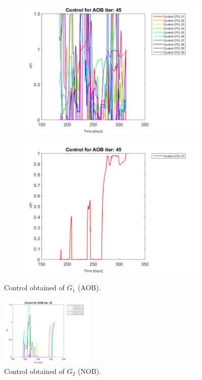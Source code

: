\documentclass[3p,times]{elsarticle}
\begin{document}
\begin{figure}[h]
\begin{subfigure}{0.45 \textwidth}
	\end{subfigure}
	\begin{subfigure}{0.45 \textwidth}
		\includegraphics[width =\textwidth]{Application//191218_Reactor_A_Control_AOB_iter_45_plot_3}
	\end{subfigure}
	\begin{subfigure}{0.45 \textwidth}
		\includegraphics[width =\textwidth]{Application//191218_Reactor_A_Control_AOB_iter_45_plot_4}
	\end{subfigure}
	\caption{Control obtained of $G_1$ (AOB).}
	\label{AOB_control}
\end{figure}
\begin{figure}[h]
	\centering
	\includegraphics[width= 0.4\textwidth]{Application//191218_Reactor_A_Control_NOB_iter_45_plot_1}
	\caption{Control obtained of $G_2$ (NOB).}
	\label{NOB_control}
\end{figure}
\end{document}
